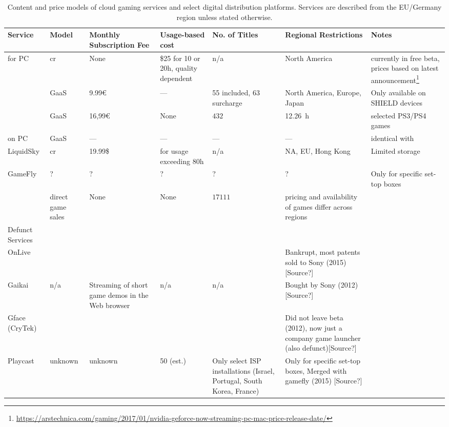 
\begin{sidewaystable*}
\centering
\caption{Content and price models of cloud gaming services and select digital distribution platforms. Services are described from the EU/Germany region unless stated otherwise.}
\label{tab:game-services}
	\begin{tabu}{X|X[c]X[c]X[c]X[c]X[c]X[c]}
	\toprule
	Service & Model & Monthly Subscription Fee & Usage-based cost & No. of Titles & Regional Restrictions  & Notes\\
	\midrule
	\midrule
	\gfnow for PC & \gls{cr} & None & \$25 for 10 or 20h, quality dependent & n/a & North America & currently in free beta, prices based on latest announcement\footnote{\url{https://arstechnica.com/gaming/2017/01/nvidia-geforce-now-streaming-pc-mac-price-release-date/}}\\
	\midrule
	\gfnow & \gls{GaaS} & 9.99€ & --- & 55 included, 63 surcharge & North America, Europe, Japan & Only available on SHIELD devices \\ %
	\midrule
	\psnow & \gls{GaaS} & 16,99€ & None & $432$ & \SI{12.26}{\hour} & selected PS3/PS4 games\\
	\midrule
	\psnow on \gls{PC} & \gls{GaaS} & --- & --- & --- & --- & identical with \psnow\\
	\midrule
	LiquidSky & \gls{cr} & 19.99\$ & for usage exceeding 80h & n/a & NA, EU, Hong Kong & Limited storage\\
	\midrule
	GameFly & ? & ? & ? & ? & ? & Only for specific set-top boxes\\
	\midrule
	\steam & direct game sales & None & None & $17111$ & pricing and availability of games differ across regions & \\


	\midrule
	Defunct Services & & & & & \\

	OnLive & & & & & Bankrupt, most patents sold to Sony (2015) [Source?]\\
	Gaikai & n/a & Streaming of short game demos in the Web browser & n/a & n/a & Bought by Sony (2012) [Source?]\\
	Gface (CryTek) & & & & &  Did not leave beta (2012), now just a company game launcher (also defunct)[Source?]\\
	Playcast & unknown & unknown & 50 (est.) & Only select ISP installations (Israel, Portugal, South Korea, France)& Only for specific set-top boxes, Merged with gamefly (2015) [Source?]\\

	\bottomrule
	\end{tabu}
\end{sidewaystable*}

